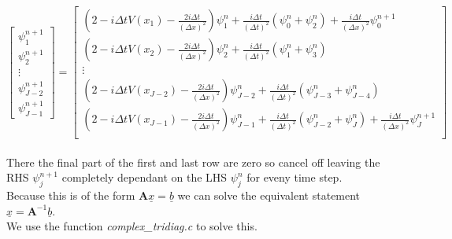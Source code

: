 \documentclass[11pt]{article} %
\begin{document}
\begin{equation}
 \begin{bmatrix}
       \psi ^{n+1} _1  \\[0.5em]
       \psi ^{n+1} _2 \\[0.5em]
       \vdots \\[0.5em]
       \psi ^{n+1} _{J-2} \\[0.5em]
        \psi ^{n+1} _{J-1} 
     \end{bmatrix} = 
 \begin{bmatrix}
       (2 - i \Delta t V(x_1) - \frac{2i \Delta t}{(\Delta x)^2}) \psi ^n _1 + \frac{i \Delta t}{(\Delta t)^2} (\psi ^n _0 + \psi ^n _2 ) + \frac{i \Delta t}{(\Delta x)^2} \psi^{n+1} _0 \\[0.5em]
       (2 - i \Delta t V(x_2) - \frac{2i \Delta t}{(\Delta x)^2}) \psi ^n _2 + \frac{i \Delta t}{(\Delta t)^2} (\psi ^n _1 + \psi ^n _3 )                       \\[0.5em]
       \vdots \\[0.5em]
       (2 - i \Delta t V(x_{J-2}) - \frac{2i \Delta t}{(\Delta x)^2}) \psi ^n _{J-2} + \frac{i \Delta t}{(\Delta t)^2} (\psi ^n _{J-3} + \psi ^n _{J-4} )\\[0.5em]
       (2 - i \Delta t V(x_{J-1}) - \frac{2i \Delta t}{(\Delta x)^2}) \psi ^n _{J-1} + \frac{i \Delta t}{(\Delta t)^2} (\psi ^n _{J-2} + \psi ^n _J ) + \frac{i \Delta t}{(\Delta x)^2} \psi^{n+1} _J \\[0.5em]
     \end{bmatrix}
\nonumber
\end{equation} \\

There the final part of the first and last row are zero so cancel off leaving the RHS $\psi ^{n+1} _j$ completely dependant on the LHS $\psi^n _j $ for eveny time step.\\

Because this is of the form $\mathbf{A} \underline{x} =\underline{b}$ we can solve the equivalent statement $ \underline{x} =\mathbf{A}^{-1} \underline{b}$. \\

We use the function \emph{complex\_tridiag.c} to solve this.
\end{document}
